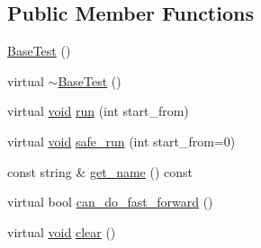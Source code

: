 \subsection*{Public Member Functions}
\begin{DoxyCompactItemize}
\item 
\hyperlink{classcvtest_1_1BaseTest_aebc1f33e648108257281029d9aba8a29}{Base\-Test} ()
\item 
virtual \hyperlink{classcvtest_1_1BaseTest_a90466c592d3bd9afd17abd160805bcf8}{$\sim$\-Base\-Test} ()
\item 
virtual \hyperlink{legacy_8hpp_a8bb47f092d473522721002c86c13b94e}{void} \hyperlink{classcvtest_1_1BaseTest_ac9bc6415ef6fba128f5deeabcfa39c0c}{run} (int start\-\_\-from)
\item 
virtual \hyperlink{legacy_8hpp_a8bb47f092d473522721002c86c13b94e}{void} \hyperlink{classcvtest_1_1BaseTest_ab5628e0021952f2358701fa4c9c147e0}{safe\-\_\-run} (int start\-\_\-from=0)
\item 
const string \& \hyperlink{classcvtest_1_1BaseTest_ac21dca0ee0ad92d06e5bf22c6f244af3}{get\-\_\-name} () const 
\item 
virtual bool \hyperlink{classcvtest_1_1BaseTest_a32f393d8cfed1ae62e2d06f8ba7ca148}{can\-\_\-do\-\_\-fast\-\_\-forward} ()
\item 
virtual \hyperlink{legacy_8hpp_a8bb47f092d473522721002c86c13b94e}{void} \hyperlink{classcvtest_1_1BaseTest_aacea157b2977c8aab837fd5c9d4c1315}{clear} ()
\end{DoxyCompactItemize}
